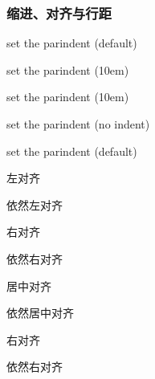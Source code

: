 \documentclass[twoside]{ctexart}
\begin{document}
        \subsubsection{缩进、对齐与行距}
            set the parindent (default)
        
            {\setlength{\parindent}{10em} set the parindent (10em)

            set the parindent (10em)}

            \noindent set the parindent (no indent)

            set the parindent (default)

            \begin{flushleft}
                左对齐

                依然左对齐
            \end{flushleft}

            \begin{flushright}
                右对齐

                依然右对齐
            \end{flushright}

            \begin{center}
                居中对齐

                依然居中对齐
            \end{center}
        
            {\raggedleft 右对齐
            
            依然右对齐

            }
\end{document}
